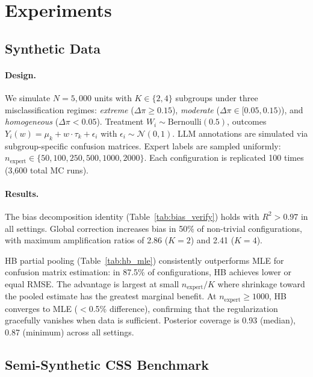 \documentclass[11pt]{article}
\newcommand{\cate}{\tau}
\newcommand{\dpi}{\Delta\pi}
\begin{document}
\section{Experiments}
\label{sec:experiments}

\subsection{Synthetic Data}
\label{sec:synthetic}

\paragraph{Design.}
We simulate $N{=}5{,}000$ units with $K \in \{2, 4\}$ subgroups under three misclassification regimes: \emph{extreme} ($\dpi \geq 0.15$), \emph{moderate} ($\dpi \in [0.05, 0.15)$), and \emph{homogeneous} ($\dpi < 0.05$).
Treatment $W_i \sim \text{Bernoulli}(0.5)$, outcomes $Y_i(w) = \mu_k + w \cdot \cate_k + \epsilon_i$ with $\epsilon_i \sim \mathcal{N}(0, 1)$.
LLM annotations are simulated via subgroup-specific confusion matrices.
Expert labels are sampled uniformly: $n_{\text{expert}} \in \{50, 100, 250, 500, 1000, 2000\}$.
Each configuration is replicated 100 times (3,600 total MC runs).

\paragraph{Results.}
The bias decomposition identity (Table~\ref{tab:bias_verify}) holds with $R^2 > 0.97$ in all settings.
Global correction increases bias in 50\% of non-trivial configurations, with maximum amplification ratios of 2.86 ($K{=}2$) and 2.41 ($K{=}4$).

HB partial pooling (Table~\ref{tab:hb_mle}) consistently outperforms MLE for confusion matrix estimation: in 87.5\% of configurations, HB achieves lower or equal RMSE.
The advantage is largest at small $n_{\text{expert}}/K$ where shrinkage toward the pooled estimate has the greatest marginal benefit.
At $n_{\text{expert}} \geq 1000$, HB converges to MLE ($<$0.5\% difference), confirming that the regularization gracefully vanishes when data is sufficient.
Posterior coverage is 0.93 (median), 0.87 (minimum) across all settings.

\subsection{Semi-Synthetic CSS Benchmark}
\label{sec:semisyn}
\end{document}
